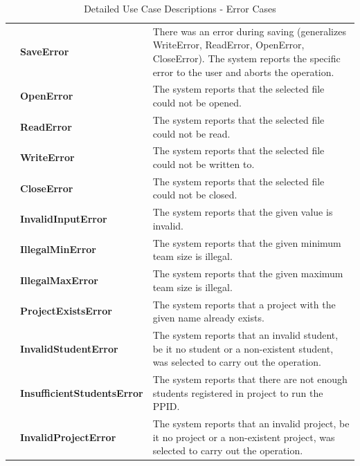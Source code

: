 \documentclass[12pt,letterpaper]{article}
\begin{document}
\begin{table}[H]
	\caption{Detailed Use Case Descriptions - Error Cases}
	\vspace{1em}
	\begin{tabu} to 
		\saveerror{} & SaveError & There was an error during saving (generalizes WriteError, ReadError, OpenError, CloseError). 
		The system reports the specific error to the user and aborts the operation.\\
		\openerror{} & OpenError & The system reports that the selected file could not be opened.\\
		\readerror{} & ReadError & The system reports that the selected file could not be read.\\
		\writeerror{} & WriteError & The system reports that the selected file could not be written to.\\
		\closeerror{} & CloseError & The system reports that the selected file could not be closed.\\
		\invalidinputerror{} & InvalidInputError & The system reports that the given value is invalid.\\
		\illegalminerror{} & IllegalMinError & The system reports that the given minimum team size is illegal.\\
		\illegalmaxerror{} & IllegalMaxError & The system reports that the given maximum team size is illegal.\\
		\projectexistserror{} & ProjectExistsError & The system reports that a project with the given name already exists.\\
		\invalidstudenterror{} & InvalidStudentError & The system reports that an invalid student, be it no student or a non-existent student, was selected to carry out the operation.\\
		\insufficientstudentserror{} & InsufficientStudentsError & The system reports that there are not enough students registered in project to
		 run the PPID.\\
        \invalidprojecterror{} & InvalidProjectError & The system reports that an invalid project, be it no project or a non-existent project, was selected to carry out the operation.\\
	\end{tabu}
\end{table}
\end{document}

